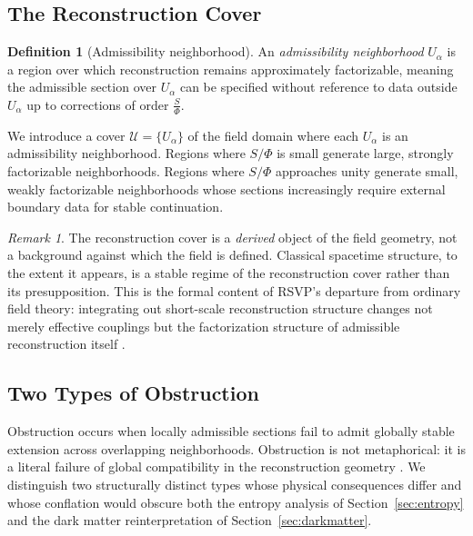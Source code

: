 \documentclass[11pt, a4paper]{article}
\theoremstyle{plain}
\theoremstyle{definition}
\newtheorem{definition}[theorem]{Definition}
\theoremstyle{remark}
\newtheorem{remark}[theorem]{Remark}
\newcommand{\ctrl}{\tfrac{S}{\Phi}}
\newcommand{\cover}{\{U_\alpha\}}
\newcommand{\Ucover}{\mathcal{U}}
\begin{document}
\subsection{The Reconstruction Cover}

\begin{definition}[Admissibility neighborhood]
An \emph{admissibility neighborhood} $U_\alpha$ is a region over which
reconstruction remains approximately factorizable, meaning the admissible section
over $U_\alpha$ can be specified without reference to data outside $U_\alpha$ up to
corrections of order $\ctrl$.
\end{definition}

We introduce a cover $\Ucover = \cover$ of the field domain where each $U_\alpha$
is an admissibility neighborhood. Regions where $S/\Phi$ is small generate large,
strongly factorizable neighborhoods. Regions where $S/\Phi$ approaches unity
generate small, weakly factorizable neighborhoods whose sections increasingly require
external boundary data for stable continuation.

\begin{remark}
\label{rem:cover-derived}
The reconstruction cover is a \emph{derived} object of the field geometry, not a
background against which the field is defined. Classical spacetime structure, to the
extent it appears, is a stable regime of the reconstruction cover rather than its
presupposition. This is the formal content of RSVP's departure from ordinary field
theory: integrating out short-scale reconstruction structure changes not merely
effective couplings but the factorization structure of admissible reconstruction
itself \cite{wilson1974,goldenfeld1992}.
\end{remark}

\subsection{Two Types of Obstruction}

Obstruction occurs when locally admissible sections fail to admit globally stable
extension across overlapping neighborhoods. Obstruction is not metaphorical: it is a
literal failure of global compatibility in the reconstruction geometry
\cite{bott1982,hatcher2002}. We distinguish two structurally distinct types whose
physical consequences differ and whose conflation would obscure both the entropy
analysis of Section~\ref{sec:entropy} and the dark matter reinterpretation of
Section~\ref{sec:darkmatter}.
\end{document}
